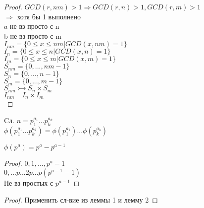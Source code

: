 \begin{theorem}
\begin{lemma}
\begin{proof}
			$ GCD(r, nm) > 1 \Rightarrow GCD(r, n) > 1, GCD(r, m) > 1 $ \\
			$ \Rightarrow $ хотя бы 1 выполнено \\
			$ a $ не вз просто с n \\
			b не вз просто с m \\
			$ I_{nm} = \{ 0 \leq x \leq nm | GCD(x, nm) = 1 \} $ \\
			$ I_{n} = \{ 0 \leq x \leq n | GCD(x, n) = 1 \} $ \\
			$ I_{m} = \{ 0 \leq x \leq m | GCD(x, m) = 1 \} $ \\
			$ S_{nm} = \{ 0, ..., nm-1 \} $ \\
			$ S_n = \{0, ..., n-1 \} $ \\
			$ S_m = \{ 0, ..., m-1 \}$ \\
			$ S_{nm} \rightarrowtail S_n \times S_m $ \\
			$ I_{nm} \ \ \ \ \ I_n \times  I_m $ \\
		\end{proof}
	\end{lemma}
	Cл. $ n = p_1^{a_1} ... p_k^{a_k} $ \\
	$ \phi(p_1^{a_1} ... p_k^{a_k}) = \phi(p_1^{a_1}) ... \phi(p_k^{a_k}) $ \\
	\begin{lemma}
		$ \phi(p^a) = p^a - p^{a-1} $ \\
		\begin{proof}
			$ 0, 1, ..., p^a - 1 $ \\
			$ 0, ... p ... 2p ... p(p^{a-1} - 1) $ \\
			Не вз простых с $ p^{a-1} $ 
		\end{proof}
	\end{lemma}
	\begin{proof}
		Применить сл-вие из леммы 1 и лемму 2 
	\end{proof}
\end{theorem} 
